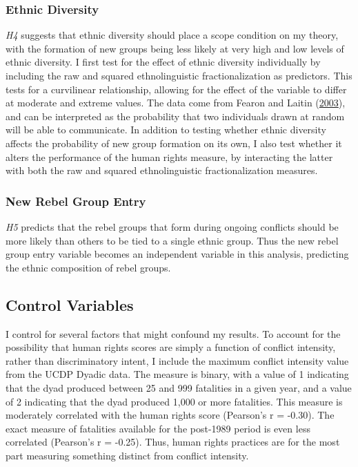 \documentclass[12pt,]{book}
\theoremstyle{definition}
\theoremstyle{definition}
\theoremstyle{remark}
\begin{document}
\subsubsection*{Ethnic Diversity}\label{ethnic-diversity}

\emph{H4} suggests that ethnic diversity should place a scope condition
on my theory, with the formation of new groups being less likely at very
high and low levels of ethnic diversity. I first test for the effect of
ethnic diversity individually by including the raw and squared
ethnolinguistic fractionalization as predictors. This tests for a
curvilinear relationship, allowing for the effect of the variable to
differ at moderate and extreme values. The data come from Fearon and
Laitin (\protect\hyperlink{ref-fearonlaitin03}{2003}), and can be
interpreted as the probability that two individuals drawn at random will
be able to communicate. In addition to testing whether ethnic diversity
affects the probability of new group formation on its own, I also test
whether it alters the performance of the human rights measure, by
interacting the latter with both the raw and squared ethnolinguistic
fractionalization measures.

\subsubsection*{New Rebel Group Entry}\label{new-rebel-group-entry}

\emph{H5} predicts that the rebel groups that form during ongoing
conflicts should be more likely than others to be tied to a single
ethnic group. Thus the new rebel group entry variable becomes an
independent variable in this analysis, predicting the ethnic composition
of rebel groups.

\subsection{Control Variables}\label{control-variables}

I control for several factors that might confound my results. To account
for the possibility that human rights scores are simply a function of
conflict intensity, rather than discriminatory intent, I include the
maximum conflict intensity value from the UCDP Dyadic data. The measure
is binary, with a value of 1 indicating that the dyad produced between
25 and 999 fatalities in a given year, and a value of 2 indicating that
the dyad produced 1,000 or more fatalities. This measure is moderately
correlated with the human rights score (Pearson's r = -0.30). The exact
measure of fatalities available for the post-1989 period is even less
correlated (Pearson's r = -0.25). Thus, human rights practices are for
the most part measuring something distinct from conflict intensity.
\end{document}
